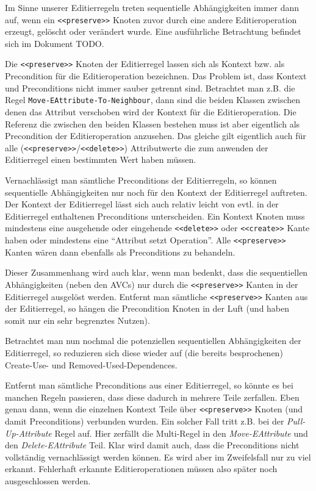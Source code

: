 Im Sinne unserer Editierregeln treten sequentielle Abhängigkeiten immer dann auf, wenn ein
\texttt{<<preserve>>} Knoten zuvor durch eine andere Editieroperation erzeugt, gelöscht oder
verändert wurde. Eine ausführliche Betrachtung befindet sich im Dokument TODO.

Die \texttt{<<preserve>>} Knoten der Editierregel lassen sich als Kontext bzw. als
Precondition für die Editieroperation bezeichnen. Das Problem ist, dass Kontext und Preconditions
nicht immer sauber getrennt sind. Betrachtet man z.B. die Regel
\texttt{Move-EAttribute-To-Neighbour}, dann sind die beiden Klassen zwischen denen das Attribut
verschoben wird der Kontext für die Editieroperation. Die Referenz die zwischen den beiden Klassen
bestehen muss ist aber eigentlich als Precondition der Editieroperation anzusehen. Das gleiche gilt
eigentlich auch für alle (\texttt{<<preserve>>}/\texttt{<<delete>>}) Attributwerte die zum
anwenden der Editierregel einen bestimmten Wert haben müssen.

Vernachlässigt man sämtliche Preconditions der Editierregeln, so können sequentielle Abhängigkeiten
nur noch für den Kontext der Editierregel auftreten. Der Kontext der Editierregel lässt sich auch
relativ leicht von evtl. in der Editierregel enthaltenen Preconditions unterscheiden. Ein Kontext
Knoten muss mindestens eine ausgehende oder eingehende \texttt{<<delete>>} oder \texttt{<<create>>}
Kante haben oder mindestens eine "`Attribut setzt Operation"'. Alle \texttt{<<preserve>>} Kanten
wären dann ebenfalls als Preconditions zu behandeln.

Dieser Zusammenhang wird auch klar, wenn man bedenkt, dass die sequentiellen Abhängigkeiten (neben
den AVCs) nur durch die \texttt{<<preserve>>} Kanten in der Editierregel ausgelöst werden. Entfernt
man sämtliche \texttt{<<preserve>>} Kanten aus der Editierregel, so hängen die Precondition Knoten
in der Luft (und haben somit nur ein sehr begrenztes Nutzen).

Betrachtet man nun nochmal die potenziellen sequentiellen Abhängigkeiten der Editierregel, so
reduzieren sich diese wieder auf (die bereits besprochenen) Create-Use- und
Removed-Used-Dependences.

Entfernt man sämtliche Preconditions aus einer Editierregel, so könnte es bei manchen
Regeln passieren, dass diese dadurch in mehrere Teile zerfallen. Eben genau dann, wenn die einzelnen
Kontext Teile über \texttt{<<preserve>>} Knoten (und damit Preconditions) verbunden wurden. Ein
solcher Fall tritt z.B. bei der \textit{Pull-Up-Attribute} Regel auf. Hier zerfällt die Multi-Regel
in den \textit{Move-EAttribute} und den \textit{Delete-EAttribute} Teil. Klar wird damit auch, dass die
Preconditions nicht vollständig vernachlässigt werden können. Es wird aber im Zweifelsfall nur zu
viel erkannt. Fehlerhaft erkannte Editieroperationen müssen also später noch ausgeschlossen werden.

